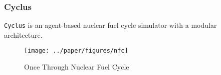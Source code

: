 \begin{frame}
    \frametitle{Cyclus}
        \texttt{Cyclus} is an agent-based nuclear fuel cycle simulator with a modular architecture.
     \\   
    \begin{figure}[htbp!]
      \begin{center}
        \texttt{[image: ../paper/figures/nfc]}
      \end{center}
            \caption{Once Through Nuclear Fuel Cycle \cite{noauthor_nuclear_nodate}}
      \label{fig:cyclus-modular}
    \end{figure}
  \end{frame}
  